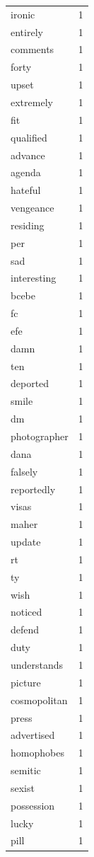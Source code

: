 \begin{tabular}{lr}
ironic & 1 \\
entirely & 1 \\
comments & 1 \\
forty & 1 \\
upset & 1 \\
extremely & 1 \\
fit & 1 \\
qualified & 1 \\
advance & 1 \\
agenda & 1 \\
hateful & 1 \\
vengeance & 1 \\
residing & 1 \\
per & 1 \\
sad & 1 \\
interesting & 1 \\
bcebe & 1 \\
fc & 1 \\
efe & 1 \\
damn & 1 \\
ten & 1 \\
deported & 1 \\
smile & 1 \\
dm & 1 \\
photographer & 1 \\
dana & 1 \\
falsely & 1 \\
reportedly & 1 \\
visas & 1 \\
maher & 1 \\
update & 1 \\
rt & 1 \\
ty & 1 \\
wish & 1 \\
noticed & 1 \\
defend & 1 \\
duty & 1 \\
understands & 1 \\
picture & 1 \\
cosmopolitan & 1 \\
press & 1 \\
advertised & 1 \\
homophobes & 1 \\
semitic & 1 \\
sexist & 1 \\
possession & 1 \\
lucky & 1 \\
pill & 1 \\

\end{tabular}
